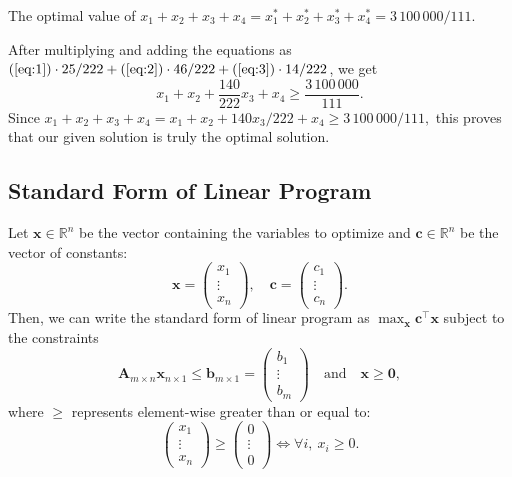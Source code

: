 \documentclass[twoside]{article}
\newcommand\R{\mathbb{R}}
\begin{document}
The optimal value of
$x_1 + x_2 + x_3 + x_4 = x_1^* + x_2^* + x_3^* + x_4^* = 3\,100\,000/111.$

After multiplying and adding the equations as
$(\ref{eq:1}) \cdot 25/222 + (\ref{eq:2}) \cdot 46/222 + (\ref{eq:3}) \cdot 14/222$,
we get \[
        x_1 + x_2 + \frac{140}{222}x_3 + x_4 \geq \frac{3\,100\,000}{111}.
\] Since
$x_1 + x_2 + x_3 + x_4 = x_1 + x_2 + 140 x_3/222 + x_4 \geq 3\,100\,000/111,$
this proves that our given solution is truly the optimal solution.

\subsection{Standard Form of Linear Program}
Let $\mathbf{x} \in \R^n$ be the vector containing the variables to optimize and
$\mathbf{c} \in \R^n$ be the vector of constants: \[
    \mathbf{x} = \begin{pmatrix} x_1 \\ \vdots \\ x_n \end{pmatrix},
    \quad
    \mathbf{c} = \begin{pmatrix} c_1 \\ \vdots \\ c_n \end{pmatrix}.
\] Then, we can write the standard form of linear program as
$\max_{\mathbf{x}} \mathbf{c}^\top \mathbf{x}$ subject to the constraints \[
    \mathbf{A}_{m \times n} \mathbf{x}_{n \times 1}
        \leq \mathbf{b}_{m \times 1}
        = \begin{pmatrix} b_1 \\ \vdots \\ b_m \end{pmatrix}
        \quad \text{and} \quad \mathbf{x} \ge \mathbf{0},
\] where $\geq$ represents element-wise greater than or equal to: \[
    \begin{pmatrix} x_1 \\ \vdots \\ x_n \end{pmatrix}
        \geq \begin{pmatrix} 0 \\ \vdots \\ 0 \end{pmatrix}
    \iff \forall i,\ x_i \geq 0.
\]
\end{document}
